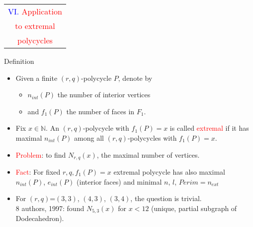 \documentclass[%
pdf,
colorBG,
slideColor,
]{prosper}
\newcommand{\NN}{\ensuremath{\mathbb{N}}}
\begin{document}
\begin{slide}{}
\begin{center}
{\Huge 
\begin{tabular*}{6.5cm}{c}
\\[-0.5cm]
\textcolor{blue}{VI. }\textcolor{red}{Application}\\
\textcolor{red}{to extremal}\\
\textcolor{red}{polycycles}
\end{tabular*}
}
\end{center}
\end{slide}



\begin{slide}{Definition}
\vspace{-3mm}
\begin{itemize}
\item Given a finite $(r,q)$-polycycle $P$, denote by 
\begin{itemize}
\item $n_{int}(P)$ the number of interior vertices
\item and $f_1(P)$ the number of faces in $F_1$.
\end{itemize}
\item Fix $x\in \NN$. An $(r,q)$-polycycle with $f_1(P)=x$ is called \textcolor{red}{extremal} if it has maximal $n_{int}(P)$ among all $(r,q)$-polycycles with $f_1(P)=x$.


\item \textcolor{red}{Problem}: to find $N_{r,q}(x)$, the maximal number of vertices.
\item \textcolor{red}{Fact}: For fixed $r, q, f_{1}(P)=x$  extremal polycycle
has also maximal $n_{int}(P)$, $e_{int}(P)$ (interior faces) and minimal $n$, $l$, $Perim=n_{ext}$
\item For $(r,q)$=$(3,3)$, $(4,3)$, $(3,4)$, the question is trivial.\\
$8$ authors, 1997: found $N_{5,3}(x)$ for $x < 12$ (unique, partial subgraph of Dodecahedron).
\end{itemize}
\end{slide}


\end{document}
